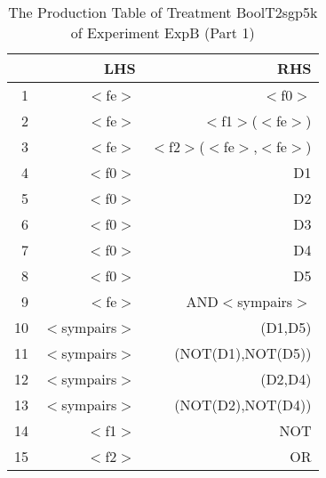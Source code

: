 \begin{table}[ht]
\centering
\begin{tabular}{rrr}
  \hline
 & LHS & RHS \\ 
  \hline
1 & $<$fe$>$ & $<$f0$>$ \\ 
  2 & $<$fe$>$ & $<$f1$>$($<$fe$>$) \\ 
  3 & $<$fe$>$ & $<$f2$>$($<$fe$>$,$<$fe$>$) \\ 
  4 & $<$f0$>$ & D1 \\ 
  5 & $<$f0$>$ & D2 \\ 
  6 & $<$f0$>$ & D3 \\ 
  7 & $<$f0$>$ & D4 \\ 
  8 & $<$f0$>$ & D5 \\ 
  9 & $<$fe$>$ & AND$<$sympairs$>$ \\ 
  10 & $<$sympairs$>$ & (D1,D5) \\ 
  11 & $<$sympairs$>$ & (NOT(D1),NOT(D5)) \\ 
  12 & $<$sympairs$>$ & (D2,D4) \\ 
  13 & $<$sympairs$>$ & (NOT(D2),NOT(D4)) \\ 
  14 & $<$f1$>$ & NOT \\ 
  15 & $<$f2$>$ & OR \\ 
   \hline
\end{tabular}
\caption{The Production Table of Treatment BoolT2sgp5k of Experiment ExpB (Part 1)} 
\end{table}
